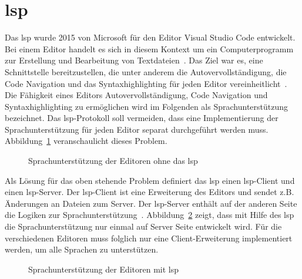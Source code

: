 \section{\acs{lsp}}

Das \ac{lsp} wurde 2015 von Microsoft für den Editor Visual Studio Code entwickelt.
Bei einem Editor handelt es sich in diesem Kontext um ein Computerprogramm zur Erstellung und Bearbeitung von Textdateien~\cite{editor-definition}.
Das Ziel war es, eine Schnittstelle bereitzustellen, die unter anderem die Autovervollständigung, die Code Navigation und das Syntaxhighlighting
für jeden Editor vereinheitlicht~\cite{lsp-witekio}.
Die Fähigkeit eines Editors Autovervollständigung, Code Navigation und Syntaxhighlighting zu ermöglichen wird im Folgenden als Sprachunterstützung bezeichnet.
Das \ac{lsp}-Protokoll soll vermeiden, dass eine Implementierung der Sprachunterstützung für jeden Editor separat durchgeführt werden muss.
Abbildung~\ref{fig:without-lsp} veranschaulicht dieses Problem.

\begin{figure}[htp] %
      \centering
      \caption{Sprachunterstützung der Editoren ohne das \acs{lsp}}
      \label{fig:without-lsp}
\end{figure}

Als Lösung für das oben stehende Problem definiert das \ac{lsp} einen \ac{lsp}-Client und einen \ac{lsp}-Server.
Der \ac{lsp}-Client ist eine Erweiterung des Editors und sendet z.B. Änderungen an Dateien zum Server.
Der \ac{lsp}-Server enthält auf der anderen Seite die Logiken zur Sprachunterstützung~\cite{lsp-witekio}.
Abbildung~\ref{fig:with-lsp} zeigt, dass mit Hilfe des \ac{lsp} die Sprachunterstützung nur einmal auf Server Seite entwickelt wird.
Für die verschiedenen Editoren muss folglich nur eine Client-Erweiterung implementiert werden, um alle Sprachen zu unterstützen.

\begin{figure}[htp] %
      \centering
      \caption{Sprachunterstützung der Editoren mit \acs{lsp}}
      \label{fig:with-lsp}
\end{figure}

